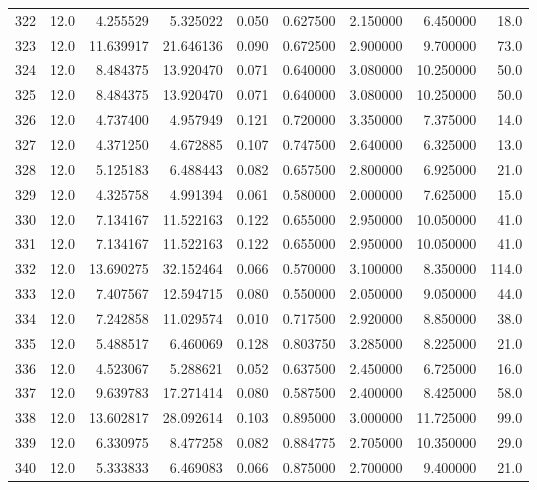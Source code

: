 \begin{tabular}{lrrrrrrrr}
322  &   12.0 &   4.255529 &   5.325022 &  0.050 &  0.627500 &  2.150000 &   6.450000 &   18.0 \\
323  &   12.0 &  11.639917 &  21.646136 &  0.090 &  0.672500 &  2.900000 &   9.700000 &   73.0 \\
324  &   12.0 &   8.484375 &  13.920470 &  0.071 &  0.640000 &  3.080000 &  10.250000 &   50.0 \\
325  &   12.0 &   8.484375 &  13.920470 &  0.071 &  0.640000 &  3.080000 &  10.250000 &   50.0 \\
326  &   12.0 &   4.737400 &   4.957949 &  0.121 &  0.720000 &  3.350000 &   7.375000 &   14.0 \\
327  &   12.0 &   4.371250 &   4.672885 &  0.107 &  0.747500 &  2.640000 &   6.325000 &   13.0 \\
328  &   12.0 &   5.125183 &   6.488443 &  0.082 &  0.657500 &  2.800000 &   6.925000 &   21.0 \\
329  &   12.0 &   4.325758 &   4.991394 &  0.061 &  0.580000 &  2.000000 &   7.625000 &   15.0 \\
330  &   12.0 &   7.134167 &  11.522163 &  0.122 &  0.655000 &  2.950000 &  10.050000 &   41.0 \\
331  &   12.0 &   7.134167 &  11.522163 &  0.122 &  0.655000 &  2.950000 &  10.050000 &   41.0 \\
332  &   12.0 &  13.690275 &  32.152464 &  0.066 &  0.570000 &  3.100000 &   8.350000 &  114.0 \\
333  &   12.0 &   7.407567 &  12.594715 &  0.080 &  0.550000 &  2.050000 &   9.050000 &   44.0 \\
334  &   12.0 &   7.242858 &  11.029574 &  0.010 &  0.717500 &  2.920000 &   8.850000 &   38.0 \\
335  &   12.0 &   5.488517 &   6.460069 &  0.128 &  0.803750 &  3.285000 &   8.225000 &   21.0 \\
336  &   12.0 &   4.523067 &   5.288621 &  0.052 &  0.637500 &  2.450000 &   6.725000 &   16.0 \\
337  &   12.0 &   9.639783 &  17.271414 &  0.080 &  0.587500 &  2.400000 &   8.425000 &   58.0 \\
338  &   12.0 &  13.602817 &  28.092614 &  0.103 &  0.895000 &  3.000000 &  11.725000 &   99.0 \\
339  &   12.0 &   6.330975 &   8.477258 &  0.082 &  0.884775 &  2.705000 &  10.350000 &   29.0 \\
340  &   12.0 &   5.333833 &   6.469083 &  0.066 &  0.875000 &  2.700000 &   9.400000 &   21.0 \\

\end{tabular}
